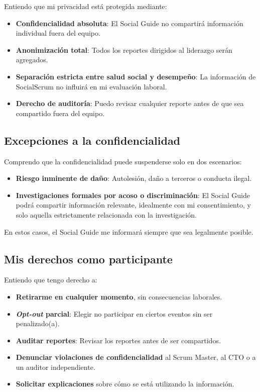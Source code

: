Entiendo que mi privacidad está protegida mediante:

\begin{itemize}
    \item \textbf{Confidencialidad absoluta}: El Social Guide no compartirá información individual fuera del equipo.
    \item \textbf{Anonimización total}: Todos los reportes dirigidos al liderazgo serán agregados.
    \item \textbf{Separación estricta entre salud social y desempeño}: La información de SocialScrum no influirá en mi evaluación laboral.
    \item \textbf{Derecho de auditoría}: Puedo revisar cualquier reporte antes de que sea compartido fuera del equipo.
\end{itemize}

\subsection{Excepciones a la confidencialidad}

Comprendo que la confidencialidad puede suspenderse solo en dos escenarios:

\begin{itemize}
    \item \textbf{Riesgo inminente de daño}: Autolesión, daño a terceros o conducta ilegal.
    \item \textbf{Investigaciones formales por acoso o discriminación}: El Social Guide podrá compartir información relevante, idealmente con mi consentimiento, y solo aquella estrictamente relacionada con la investigación.
\end{itemize}

En estos casos, el Social Guide me informará siempre que sea legalmente posible.

\subsection{Mis derechos como participante}

Entiendo que tengo derecho a:

\begin{itemize}
    \item \textbf{Retirarme en cualquier momento}, sin consecuencias laborales.
    \item \textbf{\textit{Opt-out} parcial}: Elegir no participar en ciertos eventos sin ser penalizado(a).
    \item \textbf{Auditar reportes}: Revisar los reportes antes de ser compartidos.
    \item \textbf{Denunciar violaciones de confidencialidad} al Scrum Master, al CTO o a un auditor independiente.
    \item \textbf{Solicitar explicaciones} sobre cómo se está utilizando la información.
\end{itemize}

